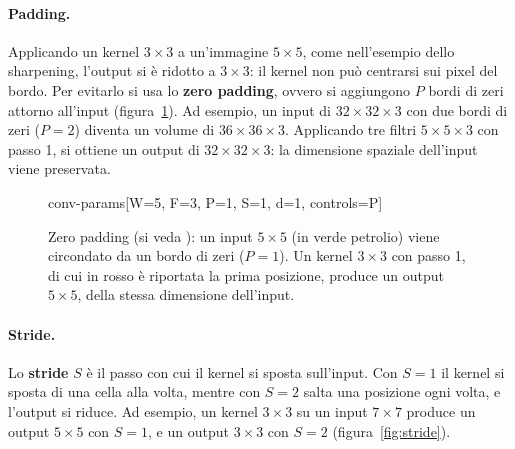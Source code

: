 \paragraph{Padding.}
Applicando un kernel $3 \times 3$ a un'immagine $5 \times 5$, come nell'esempio dello sharpening, l'output si è ridotto a $3 \times 3$: il kernel non può centrarsi sui pixel del bordo. Per evitarlo si usa lo \textbf{zero padding}, ovvero si aggiungono $P$ bordi di zeri attorno all'input (figura~\ref{fig:padding}). Ad esempio, un input di $32 \times 32 \times 3$ con due bordi di zeri ($P = 2$) diventa un volume di $36 \times 36 \times 3$. Applicando tre filtri $5 \times 5 \times 3$ con passo 1, si ottiene un output di $32 \times 32 \times 3$: la dimensione spaziale dell'input viene preservata.

\begin{figure}[htbp]
\centering
\begin{widget}{conv-params}[W=5, F=3, P=1, S=1, d=1, controls={P}]
\end{widget}
\caption{Zero padding (si veda \cite{Dumoulin2016}): un input $5 \times 5$ (in verde petrolio) viene circondato da un bordo di zeri ($P = 1$). Un kernel $3 \times 3$ con passo 1, di cui in rosso è riportata la prima posizione, produce un output $5 \times 5$, della stessa dimensione dell'input.}
\label{fig:padding}
\end{figure}

\paragraph{Stride.}
Lo \textbf{stride} $S$ è il passo con cui il kernel si sposta sull'input. Con $S = 1$ il kernel si sposta di una cella alla volta, mentre con $S = 2$ salta una posizione ogni volta, e l'output si riduce. Ad esempio, un kernel $3 \times 3$ su un input $7 \times 7$ produce un output $5 \times 5$ con $S = 1$, e un output $3 \times 3$ con $S = 2$ (figura~\ref{fig:stride}).

